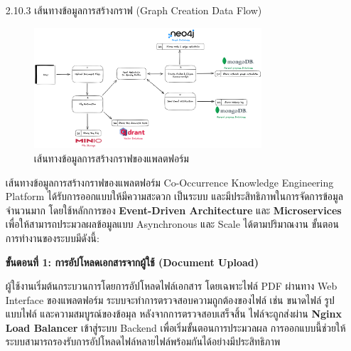 \documentclass[12pt,a4paper]{article}
\newcommand{\textlight}[1]{{\thailightfont #1}}
\begin{document}
\begin{enumerate}[leftmargin=2cm]
\begin{enumerate}
{\begin{enumerate}
            \end{enumerate}
        }

        \vspace{10cm}

        \item[2.10.3] เส้นทางข้อมูลการสร้างกราฟ (Graph Creation Data Flow)

        \begin{figure}[H]
            \centering
            \includegraphics[width=0.8\textwidth]{images/co-p-data_flow_concept.png}
            \caption{เส้นทางข้อมูลการสร้างกราฟของแพลตฟอร์ม}
            \label{fig:data_flow_concept}
        \end{figure}

        \textlight{
            \hspace{1cm}เส้นทางข้อมูลการสร้างกราฟของแพลตฟอร์ม Co-Occurrence Knowledge Engineering Platform ได้รับการออกแบบให้มีความสะดวก เป็นระบบ และมีประสิทธิภาพในการจัดการข้อมูลจำนวนมาก โดยใช้หลักการของ \textbf{Event-Driven Architecture} และ \textbf{Microservices} เพื่อให้สามารถประมวลผลข้อมูลแบบ Asynchronous และ Scale ได้ตามปริมาณงาน ขั้นตอนการทำงานของระบบมีดังนี้:

            \vspace{0.5cm}

            \textbf{ขั้นตอนที่ 1: การอัปโหลดเอกสารจากผู้ใช้ (Document Upload)}

            \hspace{1cm}ผู้ใช้งานเริ่มต้นกระบวนการโดยการอัปโหลดไฟล์เอกสาร โดยเฉพาะไฟล์ PDF ผ่านทาง Web Interface ของแพลตฟอร์ม ระบบจะทำการตรวจสอบความถูกต้องของไฟล์ เช่น ขนาดไฟล์ รูปแบบไฟล์ และความสมบูรณ์ของข้อมุล หลังจากการตรวจสอบเสร็จสิ้น ไฟล์จะถูกส่งผ่าน \textbf{Nginx Load Balancer} เข้าสู่ระบบ Backend เพื่อเริ่มขั้นตอนการประมวลผล การออกแบบนี้ช่วยให้ระบบสามารถรองรับการอัปโหลดไฟล์หลายไฟล์พร้อมกันได้อย่างมีประสิทธิภาพ

            \vspace{0.3cm}

}
\end{enumerate}
\end{enumerate}
\end{document}
